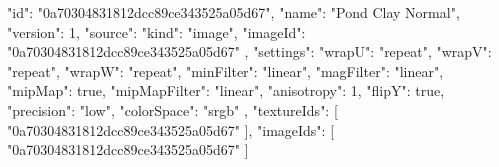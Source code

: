 {
  "id": "0a70304831812dcc89ce343525a05d67",
  "name": "Pond Clay Normal",
  "version": 1,
  "source": {
    "kind": "image",
    "imageId": "0a70304831812dcc89ce343525a05d67"
  },
  "settings": {
    "wrapU": "repeat",
    "wrapV": "repeat",
    "wrapW": "repeat",
    "minFilter": "linear",
    "magFilter": "linear",
    "mipMap": true,
    "mipMapFilter": "linear",
    "anisotropy": 1,
    "flipY": true,
    "precision": "low",
    "colorSpace": "srgb"
  },
  "textureIds": [
    "0a70304831812dcc89ce343525a05d67"
  ],
  "imageIds": [
    "0a70304831812dcc89ce343525a05d67"
  ]
}
